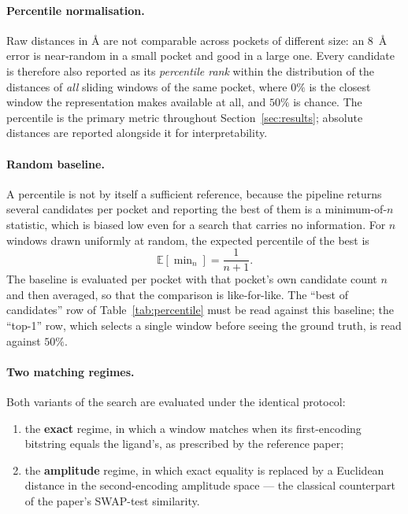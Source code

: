 \paragraph{Percentile normalisation.}
Raw distances in \AA{} are not comparable across pockets of different size: an $8$~\AA{}
error is near-random in a small pocket and good in a large one. Every candidate is
therefore also reported as its \emph{percentile rank} within the distribution of the
distances of \emph{all} sliding windows of the same pocket, where $0\%$ is the closest
window the representation makes available at all, and $50\%$ is chance. The percentile
is the primary metric throughout Section~\ref{sec:results}; absolute distances are
reported alongside it for interpretability.

\paragraph{Random baseline.}
A percentile is not by itself a sufficient reference, because the pipeline returns
several candidates per pocket and reporting the best of them is a minimum-of-$n$
statistic, which is biased low even for a search that carries no information. For $n$
windows drawn uniformly at random, the expected percentile of the best is
\begin{equation}
    \mathbb{E}\!\left[\min\nolimits_n\right] = \frac{1}{n+1}.
    \label{eq:baseline}
\end{equation}
The baseline is evaluated per pocket with that pocket's own candidate count $n$ and then
averaged, so that the comparison is like-for-like. The ``best of candidates'' row of
Table~\ref{tab:percentile} must be read against this baseline; the ``top-1'' row, which
selects a single window before seeing the ground truth, is read against $50\%$.

\paragraph{Two matching regimes.}
Both variants of the search are evaluated under the identical protocol:
\begin{enumerate}[leftmargin=1.6em]
    \item the \textbf{exact} regime, in which a window matches when its first-encoding
          bitstring equals the ligand's, as prescribed by the reference paper;
    \item the \textbf{amplitude} regime, in which exact equality is replaced by a
          Euclidean distance in the second-encoding amplitude space --- the classical
          counterpart of the paper's SWAP-test similarity.
\end{enumerate}

